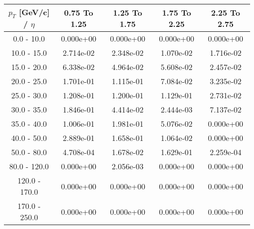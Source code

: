 \begin{tabular}{|c|c|c|c|c|}\hline 
$p_T$ [GeV/c] / $\eta$  & 0.75 To 1.25 & 1.25 To 1.75 & 1.75 To 2.25 & 2.25 To 2.75 \\ 
 \hline 
0.0 - 10.0 & 0.000e+00 & 0.000e+00 & 0.000e+00 & 0.000e+00 \\ 
10.0 - 15.0 & 2.714e-02 & 2.348e-02 & 1.070e-02 & 1.716e-02 \\ 
15.0 - 20.0 & 6.338e-02 & 4.964e-02 & 5.608e-02 & 2.457e-02 \\ 
20.0 - 25.0 & 1.701e-01 & 1.115e-01 & 7.084e-02 & 3.235e-02 \\ 
25.0 - 30.0 & 1.208e-01 & 1.200e-01 & 1.129e-01 & 2.731e-02 \\ 
30.0 - 35.0 & 1.846e-01 & 4.414e-02 & 2.444e-03 & 7.137e-02 \\ 
35.0 - 40.0 & 1.006e-01 & 1.981e-01 & 5.076e-02 & 0.000e+00 \\ 
40.0 - 50.0 & 2.889e-01 & 1.658e-01 & 1.064e-02 & 0.000e+00 \\ 
50.0 - 80.0 & 4.708e-04 & 1.678e-02 & 1.629e-01 & 2.259e-04 \\ 
80.0 - 120.0 & 0.000e+00 & 2.056e-03 & 0.000e+00 & 0.000e+00 \\ 
120.0 - 170.0 & 0.000e+00 & 0.000e+00 & 0.000e+00 & 0.000e+00 \\ 
170.0 - 250.0 & 0.000e+00 & 0.000e+00 & 0.000e+00 & 0.000e+00 \\ 
 \hline 
\end{tabular} 
